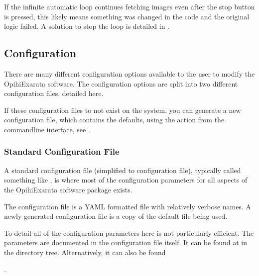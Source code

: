 \documentclass[letterpaper,11pt,english]{sphinxmanual}
\begin{document}
\sphinxAtStartPar
If the infinite automatic loop continues fetching images even after the stop
button is pressed, this likely means something was changed in the code and
the original logic failed. A solution to stop the loop is detailed in
{\hyperref[\detokenize{user/troubleshooting:user-troubleshooting-automatic-mode-stop-button-not-working}]{}}.

\sphinxstepscope


\subsection{Configuration}
\label{\detokenize{user/configuration:configuration}}\label{\detokenize{user/configuration:user-configuration}}\label{\detokenize{user/configuration::doc}}
\sphinxAtStartPar
There are many different configuration options available to the user to
modify the OpihiExarata software. The configuration options are split into
two different configuration files, detailed here.

\sphinxAtStartPar
If these configuration files to not exist on the system, you can generate a
new configuration file, which contains the defaults, using the
{\hyperref[\detokenize{user/command_line:cmdoption-arg-generate}]{}} action from the command\sphinxhyphen{}line interface, see {\hyperref[\detokenize{user/command_line:user-command-line-available-actions-generate}]{}}.


\subsubsection{Standard Configuration File}
\label{\detokenize{user/configuration:standard-configuration-file}}\label{\detokenize{user/configuration:user-configuration-standard-configuration-file}}
\sphinxAtStartPar
A standard configuration file (simplified to configuration file), typically
called something like , is where most of the
configuration parameters for all aspects of the OpihiExarata software package
exists.

\sphinxAtStartPar
The configuration file is a YAML formatted file with relatively verbose names.
A newly generated configuration file is a copy of the default file being used.

\sphinxAtStartPar
To detail all of the configuration parameters here is not particularly
efficient. The parameters are documented in the configuration file itself.
It can be found at  in
the directory tree. Alternatively, it can also be found
%
\begin{footnote}[9]\sphinxAtStartFootnote
{}
%
\end{footnote}.
\end{document}
